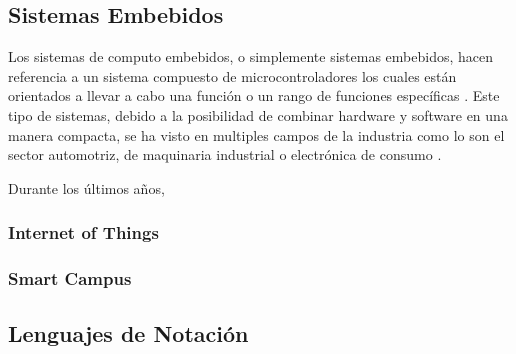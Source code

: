 \documentclass[12pt]{article}
\begin{document}

    \subsection{Sistemas Embebidos}
    

    Los sistemas de computo embebidos, o simplemente sistemas embebidos, hacen referencia a un sistema compuesto de microcontroladores los cuales están orientados a llevar a cabo una función o un rango de funciones específicas \cite{heath2002embedded}. Este tipo de sistemas, debido a la posibilidad de combinar hardware y software en una manera compacta, se ha visto en multiples campos de la industria como lo son el sector automotriz, de maquinaria industrial o electrónica de consumo \cite{deichmann_2022}.

    Durante los últimos años,

    \subsubsection{Internet of Things}




    \subsubsection{Smart Campus}

    
    \subsection{Lenguajes de Notación} %


\end{document}
